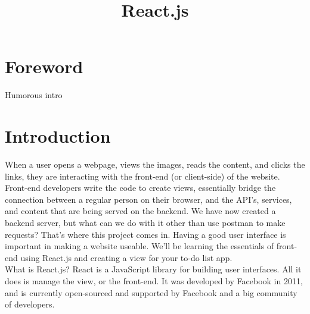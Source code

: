 \documentclass{42-en}
\begin{document}
\title{React.js}
\maketitle

\tableofcontents


\chapter{Foreword}

Humorous intro

\chapter{Introduction}

When a user opens a webpage, views the images, reads the content, and clicks the links, they are interacting with the front-end (or client-side) of the website. Front-end developers write the code to create views, essentially bridge the connection between a regular person on their browser, and the API’s, services, and content that are being served on the backend. We have now created a backend server, but what can we do with it other than use postman to make requests? That’s where this project comes in. Having a good user interface is important in making a website useable. We’ll be learning the essentials of front-end using React.js and creating a view for your to-do list app. \\

What is React.js? React is a JavaScript library for building user interfaces. All it does is manage the view, or the front-end. It was developed by Facebook in 2011, and is currently open-sourced and supported by Facebook and a big community of developers.\\
\end{document}
